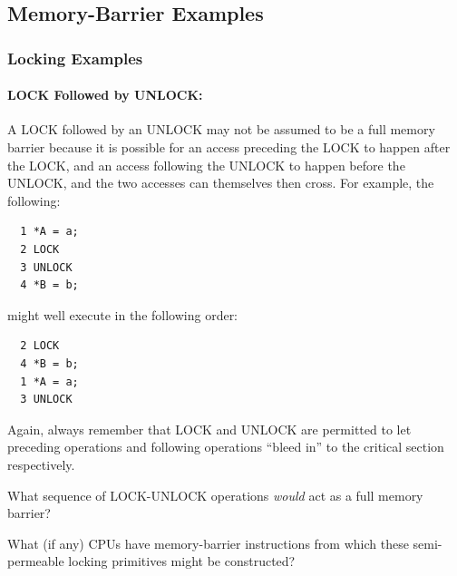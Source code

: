 \subsection{Memory-Barrier Examples}
\label{sec:advsync:Memory-Barrier Examples}

\subsubsection{Locking Examples}

\paragraph{LOCK Followed by UNLOCK:}
A LOCK followed by an UNLOCK may not be assumed to be a full memory barrier
because it is possible for an access preceding the LOCK to happen after the
LOCK, and an access following the UNLOCK to happen before the UNLOCK, and the
two accesses can themselves then cross.
For example, the following:

\vspace{5pt}
\begin{minipage}[t]{\columnwidth}
\scriptsize
\begin{verbatim}
  1 *A = a;
  2 LOCK
  3 UNLOCK
  4 *B = b;
\end{verbatim}
\end{minipage}
\vspace{5pt}

might well execute in the following order:

\vspace{5pt}
\begin{minipage}[t]{\columnwidth}
\scriptsize
\begin{verbatim}
  2 LOCK
  4 *B = b;
  1 *A = a;
  3 UNLOCK
\end{verbatim}
\end{minipage}
\vspace{5pt}

Again, always remember that LOCK and UNLOCK are permitted to let preceding
operations and following operations ``bleed in'' to the critical section
respectively.

\QuickQuiz{}
	What sequence of LOCK-UNLOCK operations \emph{would}
	act as a full memory barrier?
 \QuickQuizEnd

\QuickQuiz{}
	What (if any) CPUs have memory-barrier instructions
	from which these semi-permeable locking primitives might
	be constructed?
 \QuickQuizEnd


